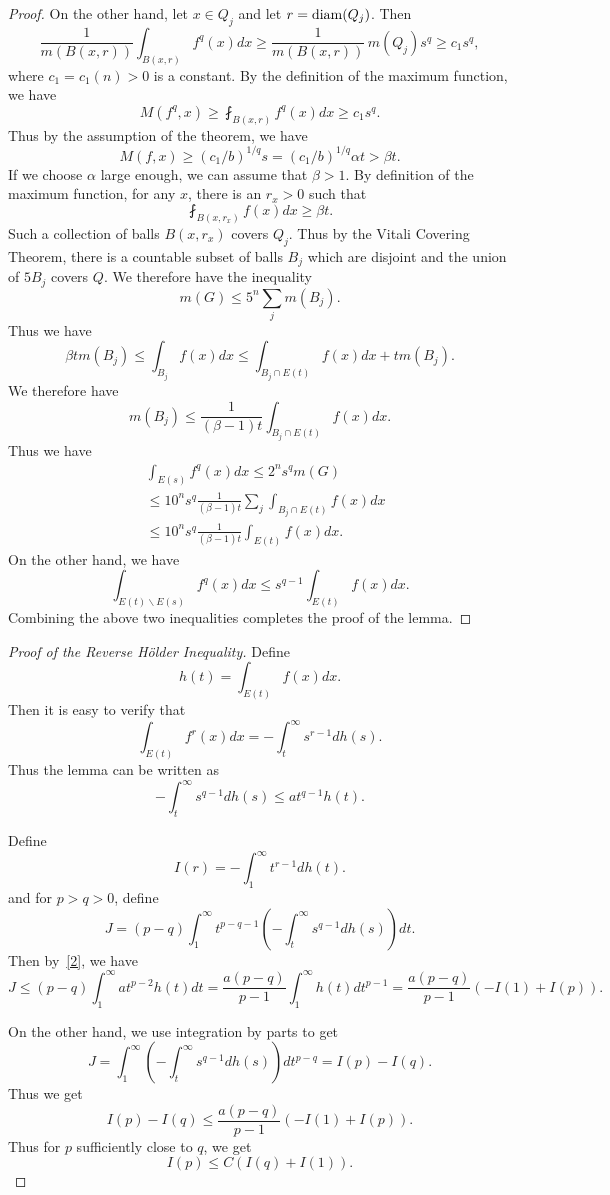 \begin{proof}
 On the other hand, let $x\in Q_j$ and let $r={\rm diam}(Q_j)$. Then
 \[
 \frac{1}{m(B(x,r))}\int_{B(x,r)} f^q(x) dx\geq \frac{1}{m(B(x,r))}\, m(Q_j) s^q\geq c_1 s^q,
 \]
 where $c_1=c_1(n)>0$ is a constant. By the definition of the maximum function, we have
 \[
 M(f^q,x)\geq\fint_{B(x,r)} f^q(x) dx\geq c_1 s^q. 
 \]
 Thus by the assumption of the theorem, we have
 \[
 M(f,x)\geq (c_1/b)^{1/q} s=(c_1/b)^{1/q} \alpha t>\beta t.
 \]
 If we choose $\alpha$ large enough, we can assume that $\beta>1$. By definition of the maximum function, for any $x$, there is an $r_x>0$ such that
 \[
 \fint_{B(x,r_x)} f(x)dx\geq \beta t.
 \]
 Such a collection of balls $B(x,r_x)$ covers $Q_j$. Thus by the Vitali Covering Theorem, there is a countable subset of balls $B_j$ which are disjoint and the union of $5B_j$ covers $Q$. We therefore have the inequality
 \[
 m(G)\leq 5^n\sum_j m(B_j).
 \]
 Thus we have
 \[
 \beta tm(B_j)\leq\int_{B_j} f(x) dx\leq\int_{B_j\cap E(t)} f(x) dx+tm(B_j).
 \]
 We therefore have
 \[
 m(B_j)\leq\frac{1}{(\beta-1) t}\int_{B_j\cap E(t)} f(x) dx. 
 \]
Thus we have
\[
\begin{split}
&\int_{E(s)} f^q(x)dx\leq 2^n s^qm(G)\\
&\leq 10^n s^q\frac{1}{(\beta-1) t}\sum_j\int_{B_j\cap E(t)} f(x) dx\\&
\leq 10^n s^q\frac{1}{(\beta-1) t}\int_{ E(t)} f(x) dx.
\end{split}
\]
 On the other hand, we have
 \[
 \int_{E(t)\backslash E(s)} f^q(x) dx\leq s^{q-1}\int_{E(t)} f(x) dx.
 \]
Combining the above two inequalities completes the proof of the lemma. 

\end{proof}
 
\begin{proof}[Proof of the Reverse H\"older Inequality]
Define
\[
h(t)=\int_{E(t)} f(x) dx.
\]
Then it is easy to verify that 
\[
\int_{E(t)} f^r(x) dx=-\int_t^\infty s^{r-1} dh(s).
\]
Thus the lemma can be written as
\begin{equation}\label{2}
-\int_t^\infty s^{q-1} dh(s)\leq at^{q-1} h(t).
\end{equation}

Define
\[
I(r)=-\int_1^\infty t^{r-1}dh(t).
\]
and for $p>q>0$, define
\[
J=(p-q)\int_1^\infty t^{p-q-1}\left(-\int_t^\infty s^{q-1}dh(s)\right) dt.
\]
Then by~\eqref{2}, we have
\[
J\leq (p-q)\int_1^\infty at^{p-2} h(t) dt=\frac{a(p-q)}{p-1}\int_1^\infty h(t) dt^{p-1}=
\frac{a(p-q)}{p-1}(-I(1)+I(p)).
\]

On the other hand, we use integration by parts to get
\[
J=\int_1^\infty\left(-\int_t^\infty s^{q-1}dh(s)\right)dt^{p-q}=I(p)-I(q).
\]
Thus we get
\[
I(p)-I(q)\leq \frac{a(p-q)}{p-1}(-I(1)+I(p)).
\]
Thus for $p$ sufficiently close to $q$, we get
\[
I(p)\leq C(I(q)+I(1)).
\]


\end{proof}



